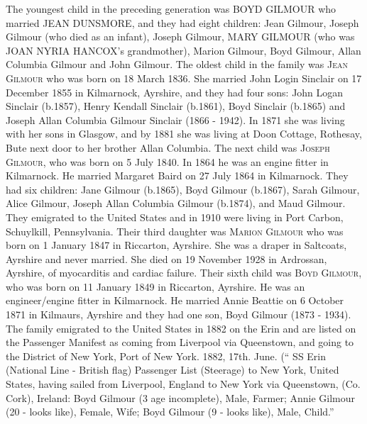 The youngest child in the preceding generation was \uppercase{Boyd Gilmour} who married \uppercase{Jean Dunsmore}, and they had eight children:  Jean Gilmour, Joseph Gilmour (who died as an infant), Joseph Gilmour, \uppercase{Mary Gilmour} (who was \uppercase{Joan Nyria Hancox}'s grandmother), Marion Gilmour, Boyd Gilmour, Allan Columbia Gilmour and John Gilmour. 
The oldest child in the family was \textsc{Jean Gilmour} who was born on 18 March 1836. She married John Login Sinclair on 17 December 1855 in Kilmarnock, Ayrshire, and they had four sons: John Logan Sinclair (b.1857), Henry Kendall Sinclair (b.1861), 
Boyd Sinclair (b.1865) and Joseph Allan Columbia Gilmour Sinclair (1866 - 1942).  In 1871 she was living with her sons in Glasgow, and by 1881 she was living at Doon Cottage, Rothesay, Bute next door to her brother Allan Columbia.
The next child was \textsc{Joseph Gilmour}, who was born on 5 July 1840. In 1864 he was an engine fitter in Kilmarnock. He married Margaret Baird on 27 July 1864 in Kilmarnock. They had six children: Jane Gilmour (b.1865), Boyd Gilmour (b.1867), Sarah Gilmour, Alice Gilmour, Joseph Allan Columbia Gilmour (b.1874), and Maud Gilmour. They emigrated to the United States and in 1910 were living in Port Carbon, Schuylkill, Pennsylvania.
Their third daughter was \textsc{Marion Gilmour} who was born on 1 January 1847 in Riccarton, Ayrshire. She was a draper in Saltcoats, Ayrshire and never married. She died on 19 November 1928 in Ardrossan, Ayrshire, of myocarditis and cardiac failure.
Their sixth child was \textsc{Boyd Gilmour}, who was born on 11 January 1849 in Riccarton, Ayrshire. He was an engineer/engine fitter in Kilmarnock. He married Annie Beattie on 6 October 1871 in Kilmaurs, Ayrshire and they had one son, Boyd Gilmour (1873 - 1934). The family emigrated to the United States in 1882 on the Erin and are listed on the Passenger Manifest as coming from Liverpool via Queenstown, and going to the District of New York, Port of New York. 1882, 17th. June. (`` SS Erin (National Line - British flag) Passenger List (Steerage) to New York, United States, having sailed from Liverpool, England to New York via Queenstown, (Co. Cork), Ireland: Boyd Gilmour (3 age incomplete), Male, Farmer; Annie Gilmour (20 - looks like), Female, Wife; Boyd Gilmour (9 - looks like), Male, Child.''
